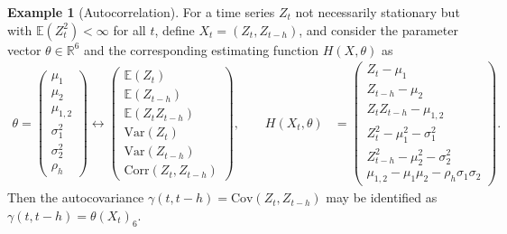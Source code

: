 \documentclass[12pt,a4paper]{article}
\theoremstyle{definition}
\newtheorem{example}{Example}[section]
\theoremstyle{definition}
\theoremstyle{theorem}
\newcommand{\R}{\mathbb{R}}
\newcommand{\E}{\mathbb{E}}
\newcommand{\Cov}{\mathrm{Cov}}
\begin{document}
\begin{example}[Autocorrelation]
    For a time series $Z_t$ not necessarily stationary but with $\E(Z_t^2) < \infty$ for all $t$, define $X_t=(Z_t,Z_{t-h})$, and consider the parameter vector $\theta \in \R^6$ and the corresponding estimating function $H(X,\theta)$ as 
    \begin{align*}
        \theta = \begin{pmatrix}
            \mu_1 \\
            \mu_2 \\
            \mu_{1,2}\\
            \sigma_1^2 \\
            \sigma_2^2 \\
            \rho_h   
        \end{pmatrix} \leftrightarrow 
        \begin{pmatrix}
            \E(Z_t) \\
            \E(Z_{t-h}) \\
            \E(Z_t Z_{t-h})\\
            \mathrm{Var}(Z_t) \\
            \mathrm{Var}(Z_{t-h}) \\
            \mathrm{Corr}(Z_t, Z_{t-h})
        \end{pmatrix},
        \qquad H(X_t,\theta) &= \begin{pmatrix}
            Z_t - \mu_1 \\
            Z_{t-h} - \mu_2 \\
            Z_t Z_{t-h} - \mu_{1,2} \\
            Z_t^2 - \mu_1^2 - \sigma_1^2 \\
            Z_{t-h}^2 - \mu_2^2 - \sigma_2^2 \\
            \mu_{1,2} - \mu_1\mu_2 - \rho_h\sigma_1\sigma_2
        \end{pmatrix}.
    \end{align*}
    Then the autocovariance $\gamma(t,t-h)=\Cov(Z_t,Z_{t-h})$ may be identified as $\gamma(t,t-h)=\theta(X_t)_6$.
\end{example}
\end{document}
